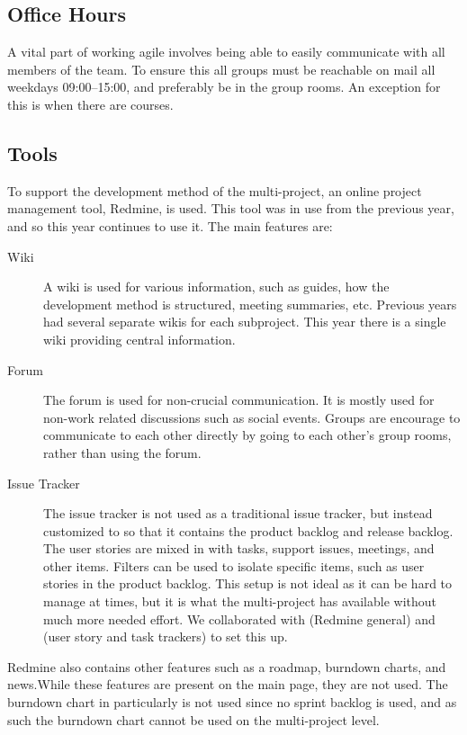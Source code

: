 \subsection{Office Hours}
A vital part of working agile involves being able to easily communicate with all members of the team. To ensure this all groups must be reachable on mail all weekdays 09:00--15:00, and preferably be in the group rooms. An exception for this is when there are courses.

\subsection{Tools}\label{sec:tools}
To support the development method of the multi-project, an online project management tool, Redmine, is used. This tool was in use from the previous year, and so this year continues to use it. The main features are:  

\begin{description}
  \item[Wiki] A wiki is used for various information, such as guides, how the development method is structured, meeting summaries, etc. Previous years had several separate wikis for each subproject. This year there is a single wiki providing central information.
  \item[Forum] The forum is used for non-crucial communication. It is mostly used for non-work related discussions such as social events. Groups are encourage to communicate to each other directly by going to each other's group rooms, rather than using the forum.
  \item[Issue Tracker] The issue tracker is not used as a traditional issue tracker, but instead customized to so that it contains the product backlog and release backlog. The user stories are mixed in with tasks, support issues, meetings, and other items. Filters can be used to isolate specific items, such as user stories in the product backlog. This setup is not ideal as it can be hard to manage at times, but it is what the multi-project has available without much more needed effort. We collaborated with  (Redmine general) and  (user story and task trackers) to set this up.
\end{description}

Redmine also contains other features such as a roadmap, burndown charts, and news.While these features are present on the main page, they are not used. The burndown chart in particularly is not used since no sprint backlog is used, and as such the burndown chart cannot be used on the multi-project level.

